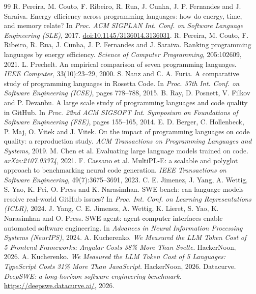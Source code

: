 \documentclass[11pt,a4paper]{article}
\begin{document}
\begin{thebibliography}{99}\small
{} R. Pereira, M. Couto, F. Ribeiro, R. Rua, J. Cunha, J. P. Fernandes and
J. Saraiva. Energy efficiency across programming languages: how do energy, time, and memory relate?
In \emph{Proc. ACM SIGPLAN Int. Conf. on Software Language Engineering (SLE)}, 2017.
\href{https://doi.org/10.1145/3136014.3136031}{doi:10.1145/3136014.3136031}.
 R. Pereira, M. Couto, F. Ribeiro, R. Rua, J. Cunha, J. P. Fernandes and
J. Saraiva. Ranking programming languages by energy efficiency. \emph{Science of Computer Programming},
205:102609, 2021.
 L. Prechelt. An empirical comparison of seven programming languages.
\emph{IEEE Computer}, 33(10):23--29, 2000.
 S. Nanz and C. A. Furia. A comparative study of programming languages in Rosetta
Code. In \emph{Proc. 37th Int. Conf. on Software Engineering (ICSE)}, pages 778--788, 2015.
 B. Ray, D. Posnett, V. Filkov and P. Devanbu. A large scale study of programming
languages and code quality in GitHub. In \emph{Proc. 22nd ACM SIGSOFT Int. Symposium on Foundations of
Software Engineering (FSE)}, pages 155--165, 2014.
 E. D. Berger, C. Hollenbeck, P. Maj, O. Vitek and J. Vitek. On the impact of
programming languages on code quality: a reproduction study. \emph{ACM Transactions on Programming
Languages and Systems}, 2019.
 M. Chen et al. Evaluating large language models trained on code.
\emph{arXiv:2107.03374}, 2021.
 F. Cassano et al. MultiPL-E: a scalable and polyglot approach to benchmarking neural
code generation. \emph{IEEE Transactions on Software Engineering}, 49(7):3675--3691, 2023.
 C. E. Jimenez, J. Yang, A. Wettig, S. Yao, K. Pei, O. Press and K. Narasimhan.
SWE-bench: can language models resolve real-world GitHub issues? In \emph{Proc. Int. Conf. on Learning
Representations (ICLR)}, 2024.
 J. Yang, C. E. Jimenez, A. Wettig, K. Lieret, S. Yao, K. Narasimhan and O. Press.
SWE-agent: agent-computer interfaces enable automated software engineering. In \emph{Advances in
Neural Information Processing Systems (NeurIPS)}, 2024.
 A. Kucherenko. \emph{We Measured the LLM Token Cost of 5 Frontend Frameworks: Angular
Costs 38\% More Than Svelte}. HackerNoon, 2026.
 A. Kucherenko. \emph{We Measured the LLM Token Cost of 5 Languages: TypeScript Costs
31\% More Than JavaScript}. HackerNoon, 2026.
 Datacurve. \emph{DeepSWE: a long-horizon software engineering benchmark}.
\url{https://deepswe.datacurve.ai/}, 2026.


\end{thebibliography}
\end{document}
